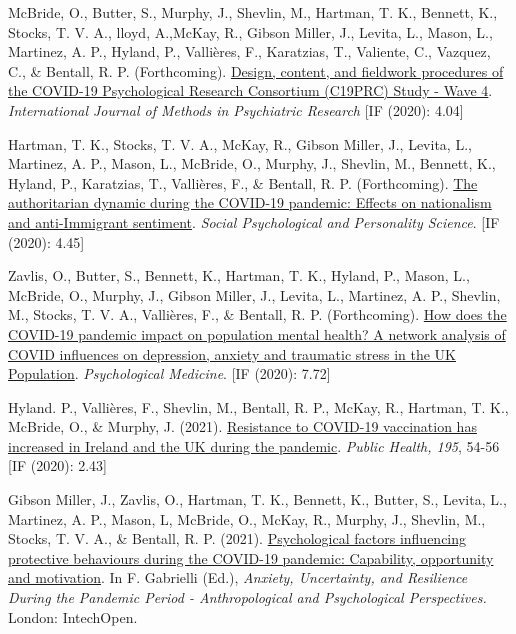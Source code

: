 \documentclass[12pt]{article}
\begin{document}
\begin{bibenum}
	\item McBride, O., Butter, S., Murphy, J., Shevlin, M., Hartman, T. K., Bennett, K.,  Stocks, T. V. A., lloyd, A.,McKay, R.,  Gibson Miller, J.,  Levita, L., Mason, L., Martinez, A. P.,  Hyland, P., Vallières, F., Karatzias, T., Valiente, C., Vazquez, C., \& Bentall, R. P. (Forthcoming). \href{https://psyarxiv.com/nytxc/}{Design, content, and fieldwork procedures of the COVID-19 Psychological Research Consortium (C19PRC) Study - Wave 4}. 
	\emph{International Journal of Methods in Psychiatric Research} [IF (2020): 4.04]

	\item Hartman, T. K.,  Stocks, T. V. A., McKay, R., Gibson Miller, J., Levita, L., 
	Martinez, A. P., Mason, L., McBride, O., Murphy, J., Shevlin, M., Bennett, K., 
	Hyland, P., Karatzias, T., Vallières, F., \& Bentall, R. P. (Forthcoming). 
		\href{https://doi.org/10.1177/1948550620978023}{The authoritarian 
		dynamic during the COVID-19 pandemic: Effects on nationalism and 
		anti-Immigrant sentiment}.
		\emph{Social Psychological and Personality Science}. [IF (2020): 4.45]
	
\item Zavlis, O., Butter, S., Bennett, K., 
	Hartman, T. K., Hyland, P., Mason, L., 
	McBride, O., Murphy, J., Gibson Miller, J., 
	Levita, L., Martinez, A. P., Shevlin, M., 
	Stocks, T. V. A., Vallières, F., \& Bentall, R. P.
	(Forthcoming). 
	\href{https://doi.org/10.1017/S0033291721000635}
	{How does the COVID-19 pandemic impact on 
	population mental health? A network analysis 
	of COVID influences on depression, anxiety 
	and traumatic stress in the UK Population}. 
	\emph{Psychological Medicine}. [IF (2020): 7.72]
	
\item Hyland. P., Vallières, F., Shevlin, M.,  
	Bentall, R. P., McKay, R., Hartman, T. K., 
	McBride, O., \& Murphy, J. (2021). 
	\href{https://doi.org/10.1016/j.puhe.2021.04.009}
	{Resistance to COVID-19 vaccination has increased 
	in Ireland and the UK during the pandemic}. 
	\emph{Public Health, 195}, 54-56 [IF (2020): 2.43]
	
\item Gibson Miller, J., Zavlis, O., Hartman, T. K., 
	Bennett, K., Butter, S., Levita, L., 
	Martinez, A. P., Mason, L, McBride, O., 
	McKay, R., Murphy, J., Shevlin, M., 
	Stocks, T. V. A., \& Bentall, R. P. (2021). 
	\href{https://doi.org/10.5772/intechopen.98237}
	{Psychological factors influencing protective 
	behaviours during the COVID-19 pandemic: 
	Capability, opportunity and motivation}. 
	In F. Gabrielli (Ed.), \textit{Anxiety, 
	Uncertainty, and Resilience During the 
	Pandemic Period - Anthropological and Psychological 
	Perspectives.} London: IntechOpen.
	

\end{bibenum}
\end{document}
